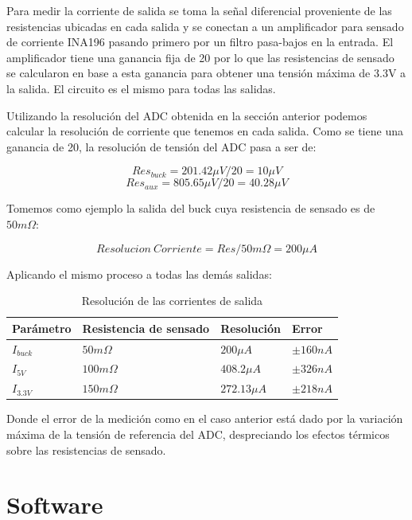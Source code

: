 \documentclass[12pt]{report}
\begin{document}
Para medir la corriente de salida se toma la señal diferencial proveniente de las resistencias ubicadas en cada salida y se conectan a un amplificador para sensado de corriente INA196 pasando primero por un filtro pasa-bajos en la entrada. El amplificador tiene una ganancia fija de 20 por lo que las resistencias de sensado se calcularon en base a esta ganancia para obtener una tensión máxima de 3.3V a la salida. El circuito es el mismo para todas las salidas.

Utilizando la resolución del ADC obtenida en la sección anterior podemos calcular la resolución de corriente que tenemos en cada salida. Como se tiene una ganancia de 20, la resolución de tensión del ADC pasa a ser de:

\begin{equation}
	Res_{buck} = 201.42 \mu V / 20 = 10\mu V
\end{equation}
\begin{equation}
	Res_{aux} = 805.65 \mu V / 20 = 40.28 \mu V
\end{equation}

Tomemos como ejemplo la salida del buck cuya resistencia de sensado es de $50m\Omega$:

\begin{equation}
	Resolucion \ Corriente = Res / 50m\Omega = 200 \mu A
\end{equation}

Aplicando el mismo proceso a todas las demás salidas:

\begin{table}[H]
	\centering
	\begin{tabular}{M{2cm}M{5cm}M{3cm}M{3cm}} \toprule
		Parámetro & Resistencia de sensado & Resolución & Error 
		\\ \midrule
		$I_{buck}$ & $50m\Omega$ & $200 \mu A$ & $\pm 160nA$ \\
		$I_{5V}$ & $100m\Omega$ & $408.2 \mu A$ & $\pm 326nA$ \\
		$I_{3.3V}$ & $150m\Omega$ & $272.13 \mu A$ & $\pm 218nA$ \\
		\bottomrule
	\end{tabular}
	\caption{Resolución de las corrientes de salida}
\end{table}

Donde el error de la medición como en el caso anterior está dado por la variación máxima de la tensión de referencia del ADC, despreciando los efectos térmicos sobre las resistencias de sensado.

\chapter{Software}
\end{document}

